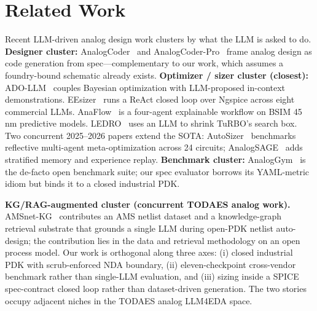 
\section{Related Work}
\label{sec:related}

Recent LLM-driven analog design work clusters by what the LLM is
asked to do. \textbf{Designer cluster:} AnalogCoder~\cite{analogcoder}
and AnalogCoder-Pro~\cite{analogcoderpro} frame analog design as
code generation from spec---complementary to our work, which
assumes a foundry-bound schematic already exists. \textbf{Optimizer /
sizer cluster (closest):} ADO-LLM~\cite{adollm} couples Bayesian
optimization with LLM-proposed in-context demonstrations.
EEsizer~\cite{eesizer} runs a ReAct closed loop over Ngspice across
eight commercial LLMs. AnaFlow~\cite{anaflow} is a four-agent
explainable workflow on BSIM 45\,nm predictive models.
LEDRO~\cite{ledro} uses an LLM to shrink TuRBO's search box. Two
concurrent 2025--2026 papers extend the SOTA:
AutoSizer~\cite{autosizer} benchmarks reflective multi-agent
meta-optimization across 24 circuits;
AnalogSAGE~\cite{analogsage} adds stratified memory and experience
replay. \textbf{Benchmark cluster:} AnalogGym~\cite{analoggym} is
the de-facto open benchmark suite; our spec evaluator borrows its
YAML-metric idiom but binds it to a closed industrial PDK.

\textbf{KG/RAG-augmented cluster (concurrent TODAES analog work).}
AMSnet-KG~\cite{amsnetkg} contributes an AMS netlist dataset and a
knowledge-graph retrieval substrate that grounds a single LLM during
open-PDK netlist auto-design; the contribution lies in the data and
retrieval methodology on an open process model. Our work is
orthogonal along three axes: (i) closed industrial PDK with
scrub-enforced NDA boundary, (ii) eleven-checkpoint cross-vendor
benchmark rather than single-LLM evaluation, and (iii) sizing inside
a SPICE spec-contract closed loop rather than dataset-driven
generation. The two stories occupy adjacent niches in the TODAES
analog LLM4EDA space.

